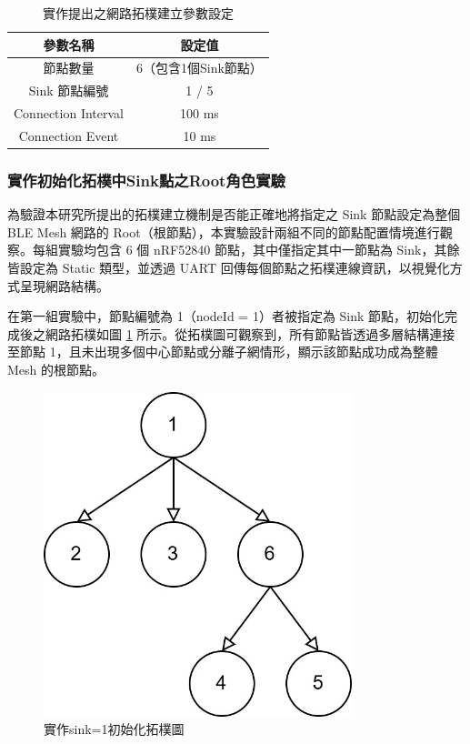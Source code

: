 \begin{ZhChapter}
\begin{table}[H]
    \centering
    \caption{實作提出之網路拓樸建立參數設定}
    \label{tab: 實作提出之網路拓樸建立參數設定}
    \begin{tabular}{|c|c|}
        \hline
        參數名稱 & 設定值 \\
        \hline
        節點數量 & 6（包含1個Sink節點） \\
        \hline
        Sink 節點編號 & 1 / 5 \\
        \hline
        Connection Interval & 100 ms \\
        \hline
        Connection Event & 10 ms \\
        \hline
    \end{tabular}
\end{table}

\subsubsection{實作初始化拓樸中Sink點之Root角色實驗}
為驗證本研究所提出的拓樸建立機制是否能正確地將指定之 Sink 節點設定為整個 BLE Mesh 網路的 Root（根節點），本實驗設計兩組不同的節點配置情境進行觀察。每組實驗均包含 6 個 nRF52840 節點，其中僅指定其中一節點為 Sink，其餘皆設定為 Static 類型，並透過 UART 回傳每個節點之拓樸連線資訊，以視覺化方式呈現網路結構。

在第一組實驗中，節點編號為 1（nodeId = 1）者被指定為 Sink 節點，初始化完成後之網路拓樸如圖 \ref{fig: 實作sink=1初始化拓樸圖} 所示。從拓樸圖可觀察到，所有節點皆透過多層結構連接至節點 1，且未出現多個中心節點或分離子網情形，顯示該節點成功成為整體 Mesh 的根節點。

\begin{figure}[H]
    \centering
    \includegraphics[width = 0.8\textwidth]{image/實作sink=1初始化拓樸圖.jpg}
    \caption{實作sink=1初始化拓樸圖}
    \label{fig: 實作sink=1初始化拓樸圖}
\end{figure}


\end{ZhChapter}
